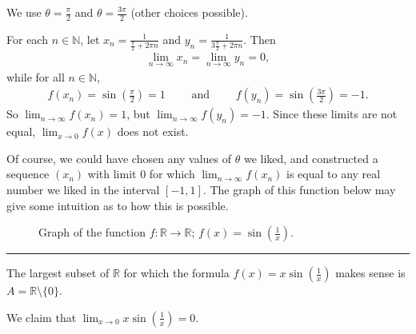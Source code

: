 \documentclass[letterpaper,10pt,english]{jupyterBook}
\let\sphinxpxdimen\pdfpxdimen\else\newdimen\sphinxpxdimen
\begin{document}
We use \(\theta=\frac{\pi}{2}\) and \(\theta=\frac{3\pi}{2}\) (other choices possible).

For each \(n\in\mathbb{N}\), let \(x_n=\frac{1}{\frac{\pi}{2} + 2\pi n}\) and \(y_n=\frac{1}{3\frac{\pi}{2} + 2\pi n}\). Then
\begin{equation*}
\begin{split}
\lim_{n\rightarrow\infty} x_{n} =\lim_{n\rightarrow\infty} y_n= 0,
\end{split}
\end{equation*}
\sphinxAtStartPar
while for all \(n\in\mathbb{N}\),
\begin{equation*}
\begin{split}
f(x_n) = \sin\left(\frac{\pi}{2}\right) =1 \hspace{2em} \text{ and } \hspace{2em} f(y_n)=\sin\left(\frac{3\pi}{2}\right)=-1.
\end{split}
\end{equation*}
\sphinxAtStartPar
So \(\lim_{n\rightarrow\infty} f(x_{n}) = 1\), but \(\lim_{n\rightarrow\infty} f(y_n) = -1\). Since these limits are not equal, \(\lim_{x\to 0} f(x)\) does not exist.

Of course, we could have chosen any values of \(\theta\) we liked, and constructed a sequence \((x_n)\) with limit \(0\) for which \(\lim_{n\rightarrow\infty}f(x_n)\) is equal to any real number we liked in the interval \([-1,1]\). The graph of this function below may give some intuition as to how this is possible.

\begin{figure}[htbp]
\centering
\capstart

\noindent\sphinxincludegraphics[width=700\sphinxpxdimen]{{sin(1,x)}.png}
\caption{Graph of the function \(f:\mathbb{R}\to\mathbb{R}\); \(f(x)=\sin\left(\frac{1}{x}\right)\).}\label{\detokenize{Solutions-full:s1x}}\end{figure}


\bigskip\hrule\bigskip


\sphinxAtStartPar
{\hyperref[\detokenize{Problems:id10}]{}} The largest subset of \(\mathbb{R}\) for which the formula \(f(x)=x\sin\left(\frac{1}{x}\right)\) makes sense is \(A = \mathbb{R} \setminus \{0\}\).

We claim that \(\displaystyle\lim_{x \rightarrow 0} x \sin\left(\frac{1}{x}\right) = 0\).
\end{document}

